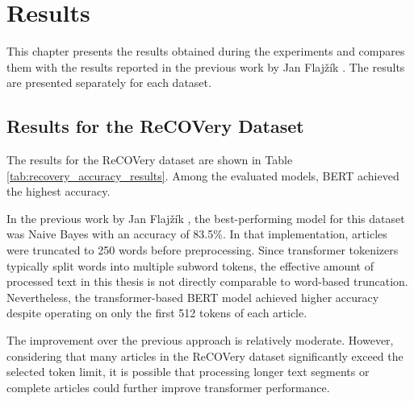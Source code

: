 \chapter{Results}

\begin{markdown}

This chapter presents the results obtained during the experiments and compares them with the results reported in the previous work by Jan Flajžík \cite{flajzik_classification_2024}. The results are presented separately for each dataset.

\end{markdown}

\section{Results for the ReCOVery Dataset}

\begin{markdown}

The results for the ReCOVery dataset are shown in Table \ref{tab:recovery_accuracy_results}. Among the evaluated models, BERT achieved the highest accuracy.

In the previous work by Jan Flajžík \cite{flajzik_classification_2024}, the best-performing model for this dataset was Naive Bayes with an accuracy of 83.5\%. In that implementation, articles were truncated to 250 words before preprocessing. Since transformer tokenizers typically split words into multiple subword tokens, the effective amount of processed text in this thesis is not directly comparable to word-based truncation. Nevertheless, the transformer-based BERT model achieved higher accuracy despite operating on only the first 512 tokens of each article.

The improvement over the previous approach is relatively moderate. However, considering that many articles in the ReCOVery dataset significantly exceed the selected token limit, it is possible that processing longer text segments or complete articles could further improve transformer performance.

\end{markdown}

\begin{table}[b]
    \small
    \centering
    \caption{Best results for the ReCOVery dataset ranked by accuracy}
    \label{tab:recovery_accuracy_results}
    
\end{table}

